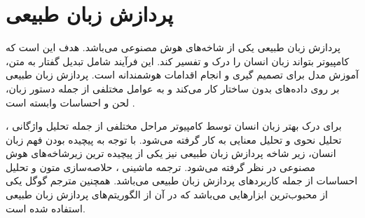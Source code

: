 \section{پردازش زبان طبیعی}
پردازش زبان طبیعی
یکی از شاخە‌های هوش مصنوعی می‌باشد. هدف این است که کامپیوتر بتواند زبان
انسان را درک و تفسیر کند. این فرآیند شامل تبدیل گفتار به متن، آموزش مدل برای تصمیم گیری و انجام اقدامات هوشمندانه است. پردازش زبان طبیعی بر روی دادە‌های بدون ساختار کار می‌کند و به عوامل مختلفی از جمله دستور زبان، لحن و احساسات وابسته است
\cite{Chowdhary2020}.

برای درک بهتر زبان انسان توسط کامپیوتر مراحل مختلفی از جمله تحلیل واژگانی
،
تحلیل نحوی
و تحلیل معنایی
به کار گرفته می‌شود. با توجه به پیچیدە بودن فهم زبان انسان، زیر شاخه پردازش زبان طبیعی نیز یکی از پیچیدە ترین زیرشاخە‌های هوش مصنوعی در نظر گرفته می‌شود. ترجمه ماشینی
،
حلاصه‌سازی متون
و تحلیل احساسات
از جمله کاربردهای پردازش زبان طبیعی می‌باشد. همچنین مترجم گوگل
یکی از محبوب‌ترین ابزارهایی می‌باشد که در آن از الگوریتم‌های پردازش زبان طبیعی استفاده شده است.
